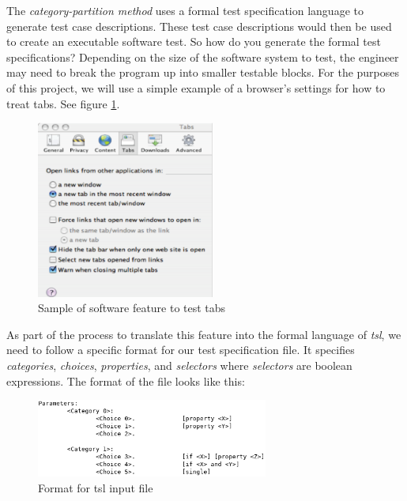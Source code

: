 \documentclass[a4full,12pt]{article}
\begin{document}
The \emph{category-partition method} uses a formal test specification language to generate
  test case descriptions. These test case descriptions would then be used to
  create an executable software test. So how do you generate the formal test 
  specifications? Depending on the size of the software system to test, the 
  engineer may need to break the program up into smaller testable blocks. For 
  the purposes of this project, we will use a simple example of a browser's 
  settings for how to treat tabs. See figure \ref{fig:tabs_example}.
\begin{figure}[htb]
\centering
\includegraphics[width=2.3in,keepaspectratio]{images/tabs_example.png}
\caption{Sample of software feature to test tabs}
\label{fig:tabs_example}
\end{figure}

As part of the process to translate this feature into the formal language of \emph{tsl},
  we need to follow a specific format for our test specification file. It specifies
  \emph{categories}, \emph{choices}, \emph{properties}, and \emph{selectors} where 
  \emph{selectors} are boolean expressions. The format of the file looks like this:
\begin{figure}[htb]
\centering
\includegraphics[width=3in,keepaspectratio]{images/tsl_format.png}
\caption{Format for tsl input file}
\label{fig:tsl_format}
\end{figure}
\end{document}

